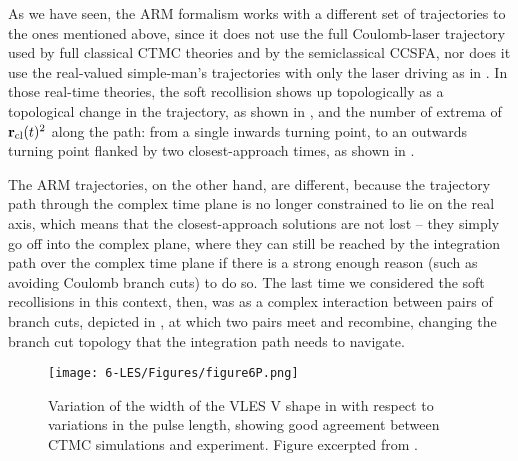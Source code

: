 As we have seen, the ARM formalism works with a different set of trajectories to the ones mentioned above, since it does not use the full Coulomb-laser trajectory used by full classical CTMC theories and by the semiclassical CCSFA, nor does it use the real-valued simple-man's trajectories with only the laser driving as in . In those real-time theories, the soft recollision shows up topologically as a topological change in the trajectory, as shown in , and the number of extrema of $\vb{r}_{\mathrm{cl}}(t)^2$ along the path: from a single inwards turning point, to an outwards turning point flanked by two closest-approach times, as shown in .

The ARM trajectories, on the other hand, are different, because the trajectory path through the complex time plane is no longer constrained to lie on the real axis, which means that the closest-approach solutions are not lost -- they simply go off into the complex plane, where they can still be reached by the integration path over the complex time plane if there is a strong enough reason (such as avoiding Coulomb branch cuts) to do so. The last time we considered the soft recollisions in this context, then, was as a complex interaction between pairs of branch cuts, depicted in , at which two pairs meet and recombine, changing the branch cut topology that the integration path needs to navigate.



\begin{figure}[!t]
  \centering
  \texttt{[image: 6-LES/Figures/figure6P.png]}
  \caption[
  Variation of the width of the VLES V shape with respect to the pulse length, as observed and CTMC-simulated by B. Wolter et al.
  ]{
  Variation of the width of the VLES V shape in  with respect to variations in the pulse length, showing good agreement between CTMC simulations and experiment.
  Figure excerpted from .
  }
\label{f6-wolter-scaling-original-figure}
\end{figure}





